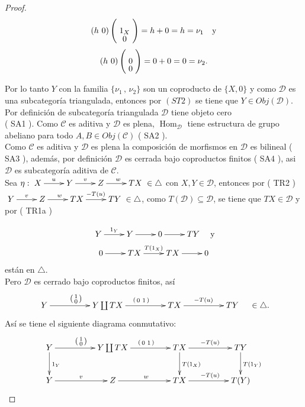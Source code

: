 \documentclass{article}
\newcommand{\spmat}[1]{%
  \left(\begin{smallmatrix}#1\end{smallmatrix}\right)%
}
\begin{document}
\begin{enumerate}
\begin{proof}
\[(h\,\,0) \left(\xymatrix@R=-1mm{1_X\\0}\right)=h+0=h=\nu_1\quad \text{y}\]
\[(h\,\,0) \left(\xymatrix@R=-1mm{0\\0}\right)=0+0=0=\nu_2.\]

Por lo tanto $Y$ con la familia $\{\nu_1\,,\,\nu_2\}$ son un coproducto de $\{X,0\}$ y como $\mathscr{D}$ es una subcategoría triangulada, entonces 
por $( ST2 )$ se tiene que $Y\in Obj(\mathscr{D})$.\\

 Por definición de subcategoría triangulada $\mathscr{D}$ tiene objeto cero \\( SA1 ). Como $\mathscr{C}$ es aditiva y $\mathscr{D}$ es 
plena, $\operatorname{Hom}_{\mathscr{D}}$ tiene estructura de grupo abeliano para todo $A,B\in Obj(\mathscr{C})$ ( SA2 ).\\

Como $\mathscr{C}$ es aditiva y $\mathscr{D}$ es plena la composición de morfismos en $\mathscr{D}$ es bilineal ( SA3 ), además, por definición
$\mathscr{D}$ es cerrada bajo coproductos finitos ( SA4 ), asi $\mathscr{D}$ es  subcategoría aditiva de $\mathscr{C}$.\\

 Sea $\eta: \xymatrix{X\ar[r]^u & Y\ar[r]^v & Z\ar[r]^w & TX } \in \triangle$ con $X,Y\in \mathscr{D}$, entonces por ( TR2 ) 
$\xymatrix{Y\ar[r]^v & Z\ar[r]^w & TX\ar[r]^{-T(u)} & TY} \in \triangle$, como $T(\mathscr{D})\subseteq \mathscr{D}$, se tiene que $TX\in 
\mathscr{D}$ y por ( TR1a ) 

\begin{gather*}
\xymatrix{Y\ar[r]^{1_Y}&Y\ar[r]&0\ar[r]&TY}\quad \text{y}\\
\xymatrix{0\ar[r]&TX\ar[r]^{T(1_{X})}&TX\ar[r]&0}
\end{gather*}
están en $\triangle$.\\

Pero $\mathscr{D}$ es cerrado bajo coproductos finitos, así 
\begin{equation*}
\xymatrix@C+2pc{Y\ar[r]^{\spmat{1 \\ 0}} & Y\coprod TX\ar[r]^{\spmat{ 0 & 1}} & TX\ar[r]^{-T(u)} & TY}\quad \in \triangle .
\end{equation*}
Así se tiene el siguiente diagrama conmutativo:\\


\begin{equation*}
\xymatrix@C+2pc{Y\ar[r]^{\spmat{1 \\ 0}}\ar[d]^{1_Y} & Y\coprod TX\ar[r]^{\spmat{ 0 & 1}} & TX\ar[d]^{T(1_X)}\ar[r]^{-T(u)} 
& TY\ar[d]^{T(1_Y)}\\
Y\ar[r]^v & Z\ar[r]^w & TX\ar[r]^{-T(u)} & T(Y)}
\end{equation*}


\end{proof}
\end{enumerate}
\end{document}
